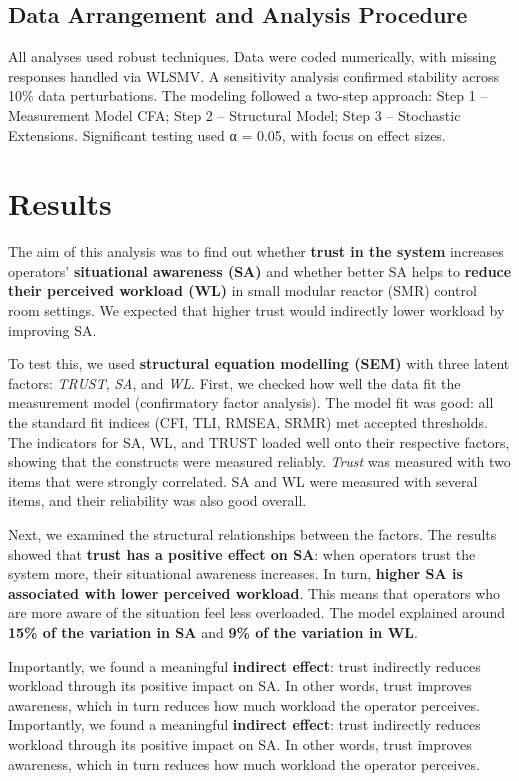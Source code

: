 \documentclass[conference]{IEEEtran}
\begin{document}
\subsection{Data Arrangement and Analysis Procedure}
All analyses used robust techniques. Data were coded numerically, with missing responses handled via WLSMV. A sensitivity analysis confirmed stability across 10\% data perturbations. The modeling followed a two-step approach: Step 1 – Measurement Model CFA; Step 2 – Structural Model; Step 3 – Stochastic Extensions. Significant testing used α = 0.05, with focus on effect sizes.



\section{Results}

The aim of this analysis was to find out whether \textbf{trust in the system} increases operators’ \textbf{situational awareness (SA)} and whether better SA helps to \textbf{reduce their perceived workload (WL)} in small modular reactor (SMR) control room settings. We expected that higher trust would indirectly lower workload by improving SA.

To test this, we used \textbf{structural equation modelling (SEM)} with three latent factors: \textit{TRUST}, \textit{SA}, and \textit{WL}. First, we checked how well the data fit the measurement model (confirmatory factor analysis). The model fit was good: all the standard fit indices (CFI, TLI, RMSEA, SRMR) met accepted thresholds. The indicators for SA, WL, and TRUST loaded well onto their respective factors, showing that the constructs were measured reliably. \textit{Trust} was measured with two items that were strongly correlated. SA and WL were measured with several items, and their reliability was also good overall.

Next, we examined the structural relationships between the factors. The results showed that \textbf{trust has a positive effect on SA}: when operators trust the system more, their situational awareness increases. In turn, \textbf{higher SA is associated with lower perceived workload}. This means that operators who are more aware of the situation feel less overloaded. The model explained around \textbf{15\% of the variation in SA} and \textbf{9\% of the variation in WL}.

Importantly, we found a meaningful \textbf{indirect effect}: trust indirectly reduces workload through its positive impact on SA. In other words, trust improves awareness, which in turn reduces how much workload the operator perceives.
Importantly, we found a meaningful \textbf{indirect effect}: trust indirectly reduces workload through its positive impact on SA. In other words, trust improves awareness, which in turn reduces how much workload the operator perceives.
\end{document}
